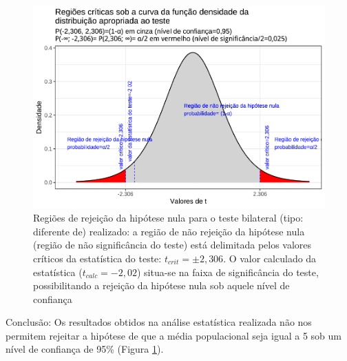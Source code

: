 \documentclass[
]{book}
\begin{document}
\begin{figure}

{\centering \includegraphics[width=1\linewidth]{apostila_files/figure-latex/fig76-1} 

}

\caption{Regiões de rejeição da hipótese nula para o teste bilateral (tipo: diferente de) realizado: a região de não rejeição da hipótese nula (região de não significância do teste) está delimitada pelos valores críticos da estatística do teste: $t_{crit} =\pm 2,306$. O valor calculado da estatística ($t_{calc}=-2,02$) situa-se na faixa de significância do teste, possibilitando a rejeição da hipótese nula sob aquele nível de confiança}\label{fig:fig76}
\end{figure}

\hfill\break

Conclusão: Os resultados obtidos na análise estatística realizada não nos permitem rejeitar a hipótese de que a média populacional seja igual a 5 sob um nível de confiança de 95\% (Figura \ref{fig:fig76}).

\hfill\break
\end{document}
